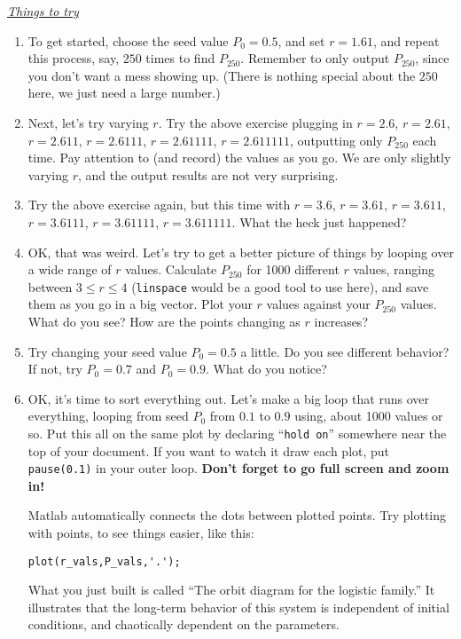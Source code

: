 \documentclass{amsart}
\theoremstyle{plain}
\theoremstyle{definition}
\theoremstyle{remark}
\numberwithin{equation}{section} %
\numberwithin{figure}{section}   %
\begin{document}
\underline{\textit{Things to try}}
\begin{enumerate}
\item 
To get started, choose the seed value $P_0=0.5$, and set $r=1.61$, and repeat this process, say, $250$ times to find $P_{250}$.  Remember to only output $P_{250}$, since you don't want a mess showing up.  (There is nothing special about the $250$ here, we just need a large number.)

\item Next, let's try varying $r$.  Try the above exercise plugging in $r=2.6$, $r=2.61$, $r=2.611$, $r=2.6111$, $r=2.61111$, $r=2.611111$, outputting only $P_{250}$ each time.  Pay attention to (and record) the values as you go.  We are only slightly varying $r$, and the output results are not very surprising.

\item Try the above exercise again, but this time with $r=3.6$, $r=3.61$, $r=3.611$, $r=3.6111$, $r=3.61111$, $r=3.611111$.  What the heck just happened?

\item OK, that was weird.  Let's try to get a better picture of things by looping over a wide range of $r$ values.  Calculate $P_{250}$ for 1000 different $r$ values, ranging between $3\leq r\leq 4$ (\texttt{linspace} would be a good tool to use here), and save them as you go in a big vector.  Plot your $r$ values against your $P_{250}$ values.  What do you see? How are the points changing as $r$ increases?

\item Try changing your seed value $P_0=0.5$ a little.  Do you see different behavior?  If not, try $P_0=0.7$ and $P_0=0.9$.  What do you notice?  

\item OK, it's time to sort everything out.  Let's make a big loop that runs over everything, looping from seed $P_0$ from $0.1$ to $0.9$ using, about 1000 values or so.  Put this all on the same plot by declaring ``\texttt{hold on}''  somewhere near the top of your document. If you want to watch it draw each plot, put \texttt{pause(0.1)} in your outer loop.  \textbf{Don't forget to go full screen and zoom in!}

Matlab automatically connects the dots between plotted points. Try plotting with points, to see things easier, like this:

\lstset{numbers=none}

\begin{minipage}[h]{5in}
\centering
\begin{lstlisting}[upquote=true]
plot(r_vals,P_vals,'.');
\end{lstlisting}
\end{minipage}

\lstset{numbers=left}

What you just built is called ``The orbit diagram for the logistic family.''  It illustrates that the long-term behavior of this system is independent of initial conditions, and chaotically dependent on the parameters.


\end{enumerate}
\end{document}
